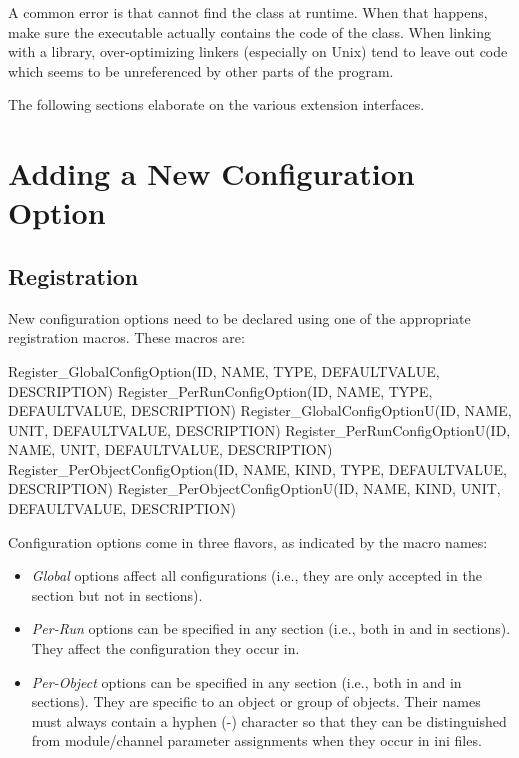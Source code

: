 \begin{note}
A common error is that {\opp} cannot find the class at runtime. When that
happens, make sure the executable actually contains the code of the class.
When linking with a library, over-optimizing linkers (especially on Unix) tend to
leave out code which seems to be unreferenced by other parts of the
program.
\end{note}

The following sections elaborate on the various extension interfaces.


\section{Adding a New Configuration Option}
\label{sec:plugin-exts:configoption}

\subsection{Registration}
\label{sec:plugin-exts:configoption:registration}

New configuration options need to be declared using one of the appropriate
registration macros. These macros are:

\begin{cpp}
Register_GlobalConfigOption(ID, NAME, TYPE, DEFAULTVALUE, DESCRIPTION)
Register_PerRunConfigOption(ID, NAME, TYPE, DEFAULTVALUE, DESCRIPTION)
Register_GlobalConfigOptionU(ID, NAME, UNIT, DEFAULTVALUE, DESCRIPTION)
Register_PerRunConfigOptionU(ID, NAME, UNIT, DEFAULTVALUE, DESCRIPTION)
Register_PerObjectConfigOption(ID, NAME, KIND, TYPE, DEFAULTVALUE, DESCRIPTION)
Register_PerObjectConfigOptionU(ID, NAME, KIND, UNIT, DEFAULTVALUE, DESCRIPTION)
\end{cpp}

Configuration options come in three flavors, as indicated by the macro names:

\begin{itemize}
  \item \textit{Global} options affect all configurations (i.e., they are
      only accepted in the \ttt{[General]} section but not in
       sections).
  \item \textit{Per-Run} options can be specified in any section
      (i.e., both in \ttt{[General]} and in  sections).
      They affect the configuration they occur in.
  \item \textit{Per-Object} options can be specified in any section
      (i.e., both in \ttt{[General]} and in  sections).
      They are specific to an object or group of objects. Their names
      must always contain a hyphen (-) character so that they can be
      distinguished from module/channel parameter assignments when they
      occur in ini files.
\end{itemize}

